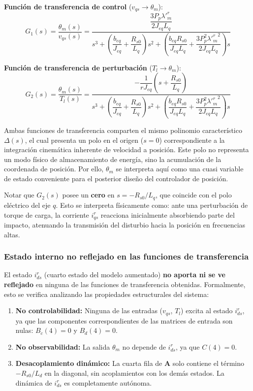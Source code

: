 \documentclass[12pt, a4paper,journal, onecolumn, compsoc]{IEEEtran}
\begin{document}
\vspace{0.3cm}
\textbf{Función de transferencia de control} ($v_{qs} \to \theta_m$):
\begin{equation} \label{eq:tf_vqs}
\boxed{
    G_1(s) = \frac{\theta_m(s)}{v_{qs}(s)} = \frac{\dfrac{3 P_p \lambda'^r_m}{2 J_{eq} L_q}}{s^3 + \left(\dfrac{b_{eq}}{J_{eq}} + \dfrac{R_{s0}}{L_q}\right)s^2 + \left(\dfrac{b_{eq} R_{s0}}{J_{eq} L_q} + \dfrac{3 P_p^2 {\lambda'^r_m}^2}{2 J_{eq} L_q}\right)s}
}
\end{equation}

\vspace{0.3cm}
\textbf{Función de transferencia de perturbación} ($T_l \to \theta_m$):
\begin{equation} \label{eq:tf_Tl}
\boxed{
    G_2(s) = \frac{\theta_m(s)}{T_l(s)} = \frac{-\dfrac{1}{r J_{eq}}\left(s + \dfrac{R_{s0}}{L_q}\right)}{s^3 + \left(\dfrac{b_{eq}}{J_{eq}} + \dfrac{R_{s0}}{L_q}\right)s^2 + \left(\dfrac{b_{eq} R_{s0}}{J_{eq} L_q} + \dfrac{3 P_p^2 {\lambda'^r_m}^2}{2 J_{eq} L_q}\right)s}
}
\end{equation}

Ambas funciones de transferencia comparten el mismo polinomio característico $\Delta(s)$, el cual presenta un polo en el origen ($s=0$) correspondiente a la integración cinemática inherente de velocidad a posición. Este polo no representa un modo físico de almacenamiento de energía, sino la acumulación de la coordenada de posición. Por ello, $\theta_m$ se interpreta aquí como una cuasi variable de estado conveniente para el posterior diseño del controlador de posición.

Notar que $G_2(s)$ posee un \textbf{cero} en $s = -R_{s0}/L_q$, que coincide con el polo eléctrico del eje $q$. Esto se interpreta físicamente como: ante una perturbación de torque de carga, la corriente $i_{qs}^r$ reacciona inicialmente absorbiendo parte del impacto, atenuando la transmisión del disturbio hacia la posición en frecuencias altas.

\subsubsection{Estado interno no reflejado en las funciones de transferencia}
El estado $i_{ds}^r$ (cuarto estado del modelo aumentado) \textbf{no aporta ni se ve reflejado} en ninguna de las funciones de transferencia obtenidas. Formalmente, esto se verifica analizando las propiedades estructurales del sistema:

\begin{enumerate}
    \item \textbf{No controlabilidad:} Ninguna de las entradas ($v_{qs}$, $T_l$) excita al estado $i_{ds}^r$, ya que las componentes correspondientes de las matrices de entrada son nulas: $B_c(4) = 0$ y $B_d(4) = 0$.
    \item \textbf{No observabilidad:} La salida $\theta_m$ no depende de $i_{ds}^r$, ya que $C(4) = 0$.
    \item \textbf{Desacoplamiento dinámico:} La cuarta fila de $\mathbf{A}$ solo contiene el término $-R_{s0}/L_d$ en la diagonal, sin acoplamientos con los demás estados. La dinámica de $i_{ds}^r$ es completamente autónoma.
\end{enumerate}
\end{document}
